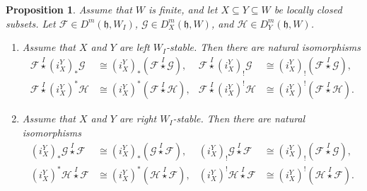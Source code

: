 \documentclass{amsart}
\newcommand{\scrF}{\mathcal{F}}
\newcommand{\scrG}{\mathcal{G}}
\newcommand{\scrH}{\mathcal{H}}
\newcommand{\BE}{D^m}
\newcommand{\fr}[1]{\mathfrak{#1}}
\newcommand{\wistar}{\stackrel{I}{\star}}
\newtheorem{proposition}{Proposition}[section]
\theoremstyle{definition}
\begin{document}
        \begin{proposition}\label{prop:pull_push_module_functors}
                Assume that $W$ is finite, and let $X \subseteq Y \subseteq W$ be locally closed subsets. Let $\scrF \in \BE (\fr{h}, W_I)$, $\scrG \in \BE_X (\fr{h}, W)$,  and $\scrH \in \BE_Y (\fr{h}, W)$.
                \begin{enumerate}
                        \item Assume that $X$ and $Y$ are left $W_I$-stable. Then there are natural isomorphisms
                        \begin{align*}
                                \scrF \wistar (i_X^Y)_* \scrG &\cong (i_X^Y)_* (\scrF \wistar \scrG), & \scrF \wistar (i_X^Y)_! \scrG &\cong (i_X^Y)_! (\scrF \wistar \scrG), \\
                                \scrF \wistar (i_X^Y)^* \scrH &\cong (i_X^Y)^* (\scrF \wistar \scrH), & \scrF \wistar (i_X^Y)^! \scrH &\cong (i_X^Y)^! (\scrF \wistar \scrH).
                        \end{align*}
                        \item Assume that $X$ and $Y$ are right $W_I$-stable. Then there are natural isomorphisms
                        \begin{align*}
                                (i_X^Y)_* \scrG \wistar \scrF &\cong (i_X^Y)_* (\scrG \wistar \scrF), & (i_X^Y)_! \scrG \wistar \scrF &\cong (i_X^Y)_! (\scrF \wistar \scrG), \\
                                (i_X^Y)^* \scrH \wistar \scrF &\cong (i_X^Y)^* (\scrH \wistar \scrF), & (i_X^Y)^! \scrH \wistar \scrF &\cong (i_X^Y)^! (\scrH \wistar \scrF).
                        \end{align*}
                \end{enumerate} 
        \end{proposition}
\end{document}
